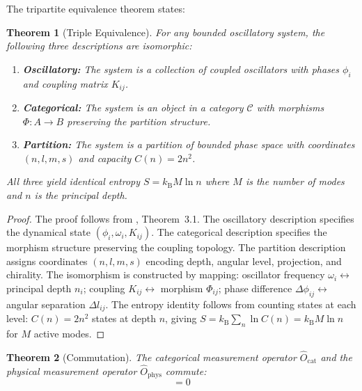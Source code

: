 \documentclass[11pt,twocolumn,a4paper]{article}
\newtheorem{theorem}{Theorem}[section]
\theoremstyle{definition}
\theoremstyle{remark}
\newcommand{\kB}{k_{\mathrm{B}}}
\newcommand{\morphism}{\Phi}
\newcommand{\natfreq}{\omega}
\begin{document}
The tripartite equivalence theorem \citep{sachikonye2025_partition} states:

\begin{theorem}[Triple Equivalence]
\label{thm:triple}
For any bounded oscillatory system, the following three descriptions are isomorphic:
\begin{enumerate}
    \item \textbf{Oscillatory:} The system is a collection of coupled oscillators with phases $\phi_i$ and coupling matrix $K_{ij}$.
    \item \textbf{Categorical:} The system is an object in a category $\mathcal{C}$ with morphisms $\morphism: A \to B$ preserving the partition structure.
    \item \textbf{Partition:} The system is a partition of bounded phase space with coordinates $(n, l, m, s)$ and capacity $C(n) = 2n^2$.
\end{enumerate}
All three yield identical entropy $S = \kB M \ln n$ where $M$ is the number of modes and $n$ is the principal depth.
\end{theorem}

\begin{proof}
The proof follows from \citet{sachikonye2025_partition}, Theorem~3.1. The oscillatory description specifies the dynamical state $(\phi_i, \natfreq_i, K_{ij})$. The categorical description specifies the morphism structure preserving the coupling topology. The partition description assigns coordinates $(n, l, m, s)$ encoding depth, angular level, projection, and chirality. The isomorphism is constructed by mapping: oscillator frequency $\natfreq_i \leftrightarrow$ principal depth $n_i$; coupling $K_{ij} \leftrightarrow$ morphism $\morphism_{ij}$; phase difference $\Delta\phi_{ij} \leftrightarrow$ angular separation $\Delta l_{ij}$. The entropy identity follows from counting states at each level: $C(n) = 2n^2$ states at depth $n$, giving $S = \kB \sum_n \ln C(n) = \kB M \ln n$ for $M$ active modes.
\end{proof}

\begin{theorem}[Commutation]
\label{thm:commutation}
The categorical measurement operator $\hat{O}_{\mathrm{cat}}$ and the physical measurement operator $\hat{O}_{\mathrm{phys}}$ commute:
\begin{equation}
[\hat{O}_{\mathrm{cat}}, \hat{O}_{\mathrm{phys}}] = 0
\end{equation}
\end{theorem}
\end{document}

